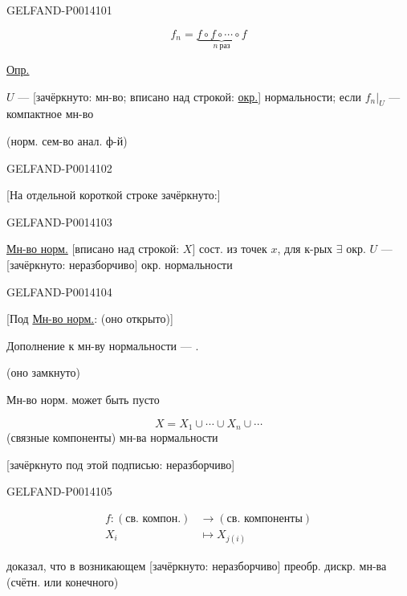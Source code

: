 \begin{GelfandAdjacentEvidence}{GELFAND-P001410}{1}

\[
f_n=\underbrace{f\circ f\circ\cdots\circ f}_{n\ \text{раз}}
\]

\uline{Опр.}

\(U\) —
[зачёркнуто: мн-во; вписано над строкой: \uline{окр.}]
нормальности; если \(\left.f_n\right|_U\) — компактное мн-во

(норм. сем-во анал. ф-й)
\end{GelfandAdjacentEvidence}
\begin{GelfandAdjacentEvidence}{GELFAND-P001410}{2}


[На отдельной короткой строке зачёркнуто:]
\end{GelfandAdjacentEvidence}
\begin{GelfandAdjacentEvidence}{GELFAND-P001410}{3}


\uline{Мн-во норм.} [вписано над строкой: \(X\)] сост. из точек \(x\),
для к-рых \(\exists\) окр. \(U\) ---
[зачёркнуто: неразборчиво] окр. нормальности
\end{GelfandAdjacentEvidence}
\begin{GelfandAdjacentEvidence}{GELFAND-P001410}{4}


[Под \uline{Мн-во норм.}: (оно открыто)]

Дополнение к мн-ву нормальности — .

(оно замкнуто)

Мн-во норм. может быть пусто

\[
X=X_1\cup\cdots\cup X_n\cup\cdots
\]
(связные компоненты) мн-ва нормальности

[зачёркнуто под этой подписью: неразборчиво]
\end{GelfandAdjacentEvidence}
\begin{GelfandAdjacentEvidence}{GELFAND-P001410}{5}


\[
\begin{aligned}
f:(\text{св. компон.})&\to(\text{св. компоненты})\\
X_i&\mapsto X_{j(i)}
\end{aligned}
\]

 доказал, что в возникающем [зачёркнуто: неразборчиво]
преобр. дискр. мн-ва (счётн. или конечного)
\end{GelfandAdjacentEvidence}
